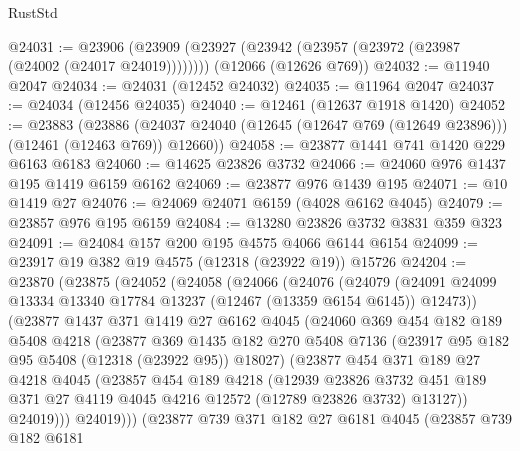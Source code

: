 \begin{lexlean}{RustStd}
\begin{coremodule}
@24031 := @23906
    (@23909 (@23927 (@23942 (@23957 (@23972 (@23987 (@24002 (@24017 @24019))))))))
    (@12066 (@12626 @769))
@24032 := @11940 @2047
@24034 := @24031 (@12452 @24032)
@24035 := @11964 @2047
@24037 := @24034 (@12456 @24035)
@24040 := @12461 (@12637 @1918 @1420)
@24052 := @23883
    (@23886 (@24037 @24040 (@12645 (@12647 @769 (@12649 @23896))) (@12461 (@12463 @769)) @12660))
@24058 := @23877 @1441 @741 @1420 @229 @6163 @6183
@24060 := @14625 @23826 @3732
@24066 := @24060 @976 @1437 @195 @1419 @6159 @6162
@24069 := @23877 @976 @1439 @195
@24071 := @10 @1419 @27
@24076 := @24069 @24071 @6159 (@4028 @6162 @4045)
@24079 := @23857 @976 @195 @6159
@24084 := @13280 @23826 @3732 @3831 @359 @323
@24091 := @24084 @157 @200 @195 @4575 @4066 @6144 @6154
@24099 := @23917 @19 @382 @19 @4575 (@12318 (@23922 @19)) @15726
@24204 := @23870
    (@23875
      (@24052
        (@24058
          (@24066
            (@24076
              (@24079
                (@24091 @24099 @13334 @13340 @17784 @13237 (@12467 (@13359 @6154 @6145)) @12473))
              (@23877
                @1437
                @371
                @1419
                @27
                @6162
                @4045
                (@24060
                  @369
                  @454
                  @182
                  @189
                  @5408
                  @4218
                  (@23877
                    @369
                    @1435
                    @182
                    @270
                    @5408
                    @7136
                    (@23917 @95 @182 @95 @5408 (@12318 (@23922 @95)) @18027)
                    (@23877
                      @454
                      @371
                      @189
                      @27
                      @4218
                      @4045
                      (@23857
                        @454
                        @189
                        @4218
                        (@12939
                          @23826
                          @3732
                          @451
                          @189
                          @371
                          @27
                          @4119
                          @4045
                          @4216
                          @12572
                          (@12789 @23826 @3732)
                          @13127))
                      @24019)))
                @24019)))
          (@23877
            @739
            @371
            @182
            @27
            @6181
            @4045
            (@23857
              @739
              @182
              @6181

\end{coremodule}
\end{lexlean}
